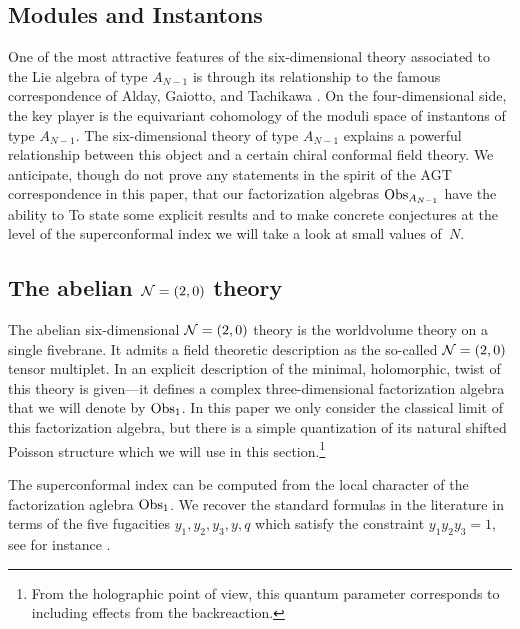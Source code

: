 \subsection{Modules and Instantons}
One of the most attractive features of the six-dimensional theory associated to the Lie algebra of type $A_{N-1}$ is through its relationship to the famous correspondence of Alday, Gaiotto, and Tachikawa \cite{AGT}. 
On the four-dimensional side, the key player is the equivariant cohomology of the moduli space of instantons of type $A_{N-1}$. 
The six-dimensional theory of type $A_{N-1}$ explains a powerful relationship between this object and a certain chiral conformal field theory. 
We anticipate, though do not prove any statements in the spirit of the AGT correspondence in this paper, that our factorization algebras $\operatorname{Obs}_{A_{N-1}}$ have the ability to 
To state some explicit results and to make concrete conjectures at the level of the superconformal index we will take a look at small values of~$N$. 

\subsection*{The abelian $\mathcal N=(2,0)$ theory}

The abelian six-dimensional $\mathcal N=(2,0)$ theory is the worldvolume theory on a single fivebrane. 
It admits a field theoretic description as the so-called $\mathcal N=(2,0)$ tensor multiplet. 
In \cite{SWtensor} an explicit description of the minimal, holomorphic, twist of this theory is given---it defines a complex three-dimensional factorization algebra that we will denote by $\operatorname{Obs}_1$.
In this paper we only consider the classical limit of this factorization algebra, but there is a simple quantization of its natural shifted Poisson structure which we will use in this section.\footnote{From the holographic point of view, this quantum parameter corresponds to including effects from the backreaction.}

The superconformal index can be computed from the local character of the factorization aglebra $\operatorname{Obs}_1$. 
We recover the standard formulas in the literature in terms of the five fugacities $y_1,y_2,y_3,y,q$ which satisfy the constraint $y_1 y_2 y_3 = 1$, see for instance \cite{Kim:2013nva}.

